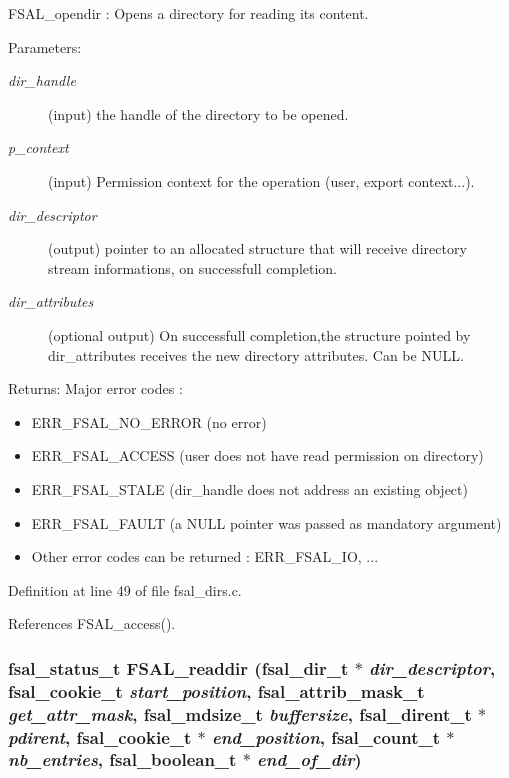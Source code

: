 FSAL\_\-opendir : Opens a directory for reading its content.

\begin{Desc}
\item[Parameters:]
\begin{description}
\item[{\em dir\_\-handle}](input) the handle of the directory to be opened. \item[{\em p\_\-context}](input) Permission context for the operation (user, export context...). \item[{\em dir\_\-descriptor}](output) pointer to an allocated structure that will receive directory stream informations, on successfull completion. \item[{\em dir\_\-attributes}](optional output) On successfull completion,the structure pointed by dir\_\-attributes receives the new directory attributes. Can be NULL.\end{description}
\end{Desc}
\begin{Desc}
\item[Returns:]Major error codes :\begin{itemize}
\item ERR\_\-FSAL\_\-NO\_\-ERROR (no error)\item ERR\_\-FSAL\_\-ACCESS (user does not have read permission on directory)\item ERR\_\-FSAL\_\-STALE (dir\_\-handle does not address an existing object)\item ERR\_\-FSAL\_\-FAULT (a NULL pointer was passed as mandatory argument)\item Other error codes can be returned : ERR\_\-FSAL\_\-IO, ... \end{itemize}
\end{Desc}


Definition at line 49 of file fsal\_\-dirs.c.

References FSAL\_\-access().
\subsubsection[{FSAL\_\-readdir}]{\setlength{\rightskip}{0pt plus 5cm}fsal\_\-status\_\-t FSAL\_\-readdir (fsal\_\-dir\_\-t $\ast$ {\em dir\_\-descriptor}, \/  fsal\_\-cookie\_\-t {\em start\_\-position}, \/  fsal\_\-attrib\_\-mask\_\-t {\em get\_\-attr\_\-mask}, \/  fsal\_\-mdsize\_\-t {\em buffersize}, \/  fsal\_\-dirent\_\-t $\ast$ {\em pdirent}, \/  fsal\_\-cookie\_\-t $\ast$ {\em end\_\-position}, \/  fsal\_\-count\_\-t $\ast$ {\em nb\_\-entries}, \/  fsal\_\-boolean\_\-t $\ast$ {\em end\_\-of\_\-dir})}\label{fsal__dirs_8c_7b3713c98cca4f6be6893c649e1f43ba}


